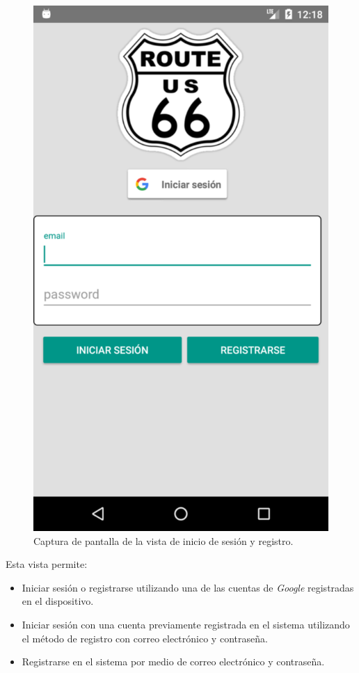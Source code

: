 \documentclass[twoside]{report}
\begin{document}
\begin{figure}[H]
\begin{center}
\includegraphics[scale=0.2]{images/userguide/0.png}
\caption{Captura de pantalla de la vista de inicio de sesión y registro.}
\end{center}
\end{figure}

Esta vista permite:
\begin{itemize}
\item Iniciar sesión o registrarse utilizando una de las cuentas de \textit{Google} registradas en el dispositivo.
\item Iniciar sesión con una cuenta previamente registrada en el sistema utilizando el método de registro con correo electrónico y contraseña.
\item Registrarse en el sistema por medio de correo electrónico y contraseña.
\end{itemize}
\end{document}
